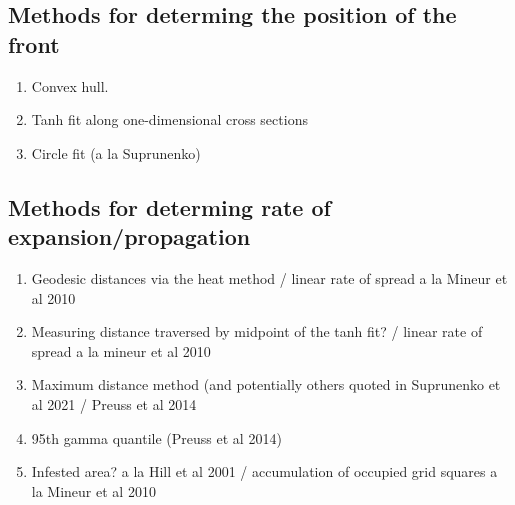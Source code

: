 \documentclass[9pt, reqno]{amsart}
\numberwithin{equation}{section}
\renewcommand{\(}{\left(}
\renewcommand{\)}{\right)}
\theoremstyle{definition}
\theoremstyle{definition}
\theoremstyle{definition}
\begin{document}
	

	\subsection*{Methods for determing the position of the front}
	\begin{enumerate}
		\item Convex hull. 	
		\item Tanh fit along one-dimensional cross sections
		\item Circle fit (a la Suprunenko)

	\end{enumerate}

	\subsection*{Methods for determing rate of expansion/propagation}
	\begin{enumerate}
		\item Geodesic distances via the heat method  / linear rate of spread a la Mineur et al 2010
		\item Measuring distance traversed by midpoint of the tanh fit? / linear rate of spread a la mineur et al 2010
		\item Maximum distance method (and potentially others quoted in Suprunenko et al 2021 / Preuss et al 2014
		\item 95th gamma quantile (Preuss et al 2014)
		\item Infested area? a la Hill et al 2001 / accumulation of occupied grid squares a la Mineur et al 2010
	\end{enumerate}
\end{document}
